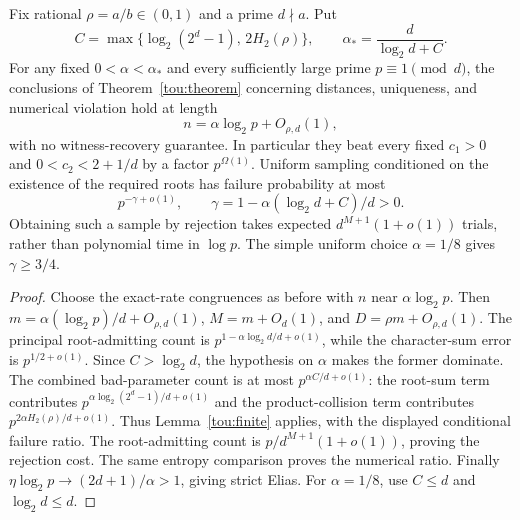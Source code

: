 \begin{corollary}\label{tou:short}
Fix rational $\rho=a/b\in(0,1)$ and a prime $d\nmid a$. Put
\[
 C=\max\{\log_2(2^d-1),\,2H_2(\rho)\},\qquad
 \alpha_* = \frac{d}{\log_2d+C}.
\]
For any fixed $0<\alpha<\alpha_*$ and every sufficiently large prime
$p\equiv1\pmod d$, the conclusions of Theorem~\ref{tou:theorem}
concerning distances, uniqueness, and numerical violation hold at length
\[
 n=\alpha\log_2p+O_{\rho,d}(1),
\]
with no witness-recovery guarantee. In particular they beat every fixed
$c_1>0$ and $0<c_2<2+1/d$ by a factor $p^{\Omega(1)}$.
Uniform sampling conditioned on the existence of the required roots
has failure probability at most
\[
 p^{-\gamma+o(1)},\qquad
 \gamma=1-\alpha(\log_2d+C)/d>0.
\]
Obtaining such a sample by rejection takes expected
$d^{M+1}(1+o(1))$ trials, rather than polynomial time in $\log p$.
The simple uniform choice $\alpha=1/8$ gives $\gamma\ge3/4$.
\end{corollary}
\begin{proof}
Choose the exact-rate congruences as before with $n$ near
$\alpha\log_2p$. Then $m=\alpha(\log_2p)/d+O_{\rho,d}(1)$,
$M=m+O_d(1)$, and $D=\rho m+O_{\rho,d}(1)$.
The principal root-admitting count is
$p^{1-\alpha\log_2d/d+o(1)}$, while the character-sum error is
$p^{1/2+o(1)}$. Since $C>\log_2d$, the hypothesis on $\alpha$
makes the former dominate.
The combined bad-parameter count is at most
$p^{\alpha C/d+o(1)}$: the root-sum term contributes
$p^{\alpha\log_2(2^d-1)/d+o(1)}$ and the product-collision term
contributes $p^{2\alpha H_2(\rho)/d+o(1)}$.
Thus Lemma~\ref{tou:finite} applies, with the displayed conditional
failure ratio. The root-admitting count is
$p/d^{M+1}(1+o(1))$, proving the rejection cost.
The same entropy comparison proves the numerical ratio.
Finally $\eta\log_2p\to(2d+1)/\alpha>1$, giving strict Elias.
For $\alpha=1/8$, use $C\le d$ and $\log_2d\le d$.
\end{proof}
